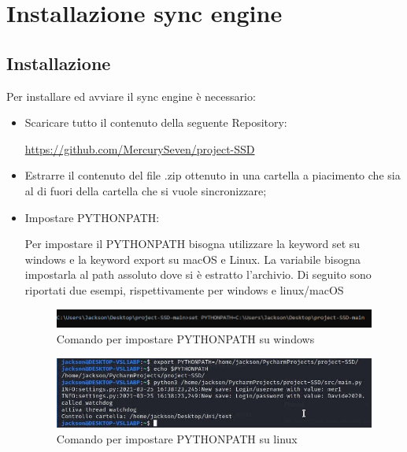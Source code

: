 \section{Installazione sync engine}

\subsection{Installazione}
Per installare ed avviare il sync engine è necessario:
\begin{itemize}
	\item Scaricare tutto il contenuto della seguente Repository:
	
\centerline{\url{https://github.com/MercurySeven/project-SSD}}

	\item Estrarre il contenuto del file .zip ottenuto in una cartella a piacimento che sia al di fuori della cartella che si vuole sincronizzare;
	
\item Impostare PYTHONPATH:

Per impostare il PYTHONPATH bisogna utilizzare la keyword set su windows e la keyword export su macOS e Linux. La variabile bisogna impostarla al path assoluto dove si è estratto l'archivio.
Di seguito sono riportati due esempi, rispettivamente per windows e linux/macOS
\begin{figure}[H]
    \centering
    \includegraphics[scale = 0.65]{components/img/Windows-istruzione-1.png}
    \caption{Comando per impostare PYTHONPATH su windows}
    \label{fig:comando per impostare PYTHONPATH su windows}
\end{figure}
\begin{figure}[H]
    \centering
    \includegraphics[scale = 0.65]{components/img/linux-istruzione-1.jpg}
    \caption{ Comando per impostare PYTHONPATH su linux}
    \label{fig:comando per impostare PYTHONPATH su windows}
\end{figure}


\end{itemize}
